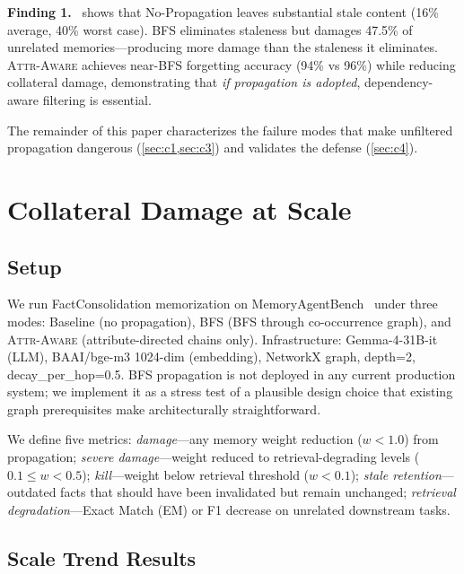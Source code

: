 \documentclass{article}
\newcommand{\attraware}{\textsc{Attr-Aware}}
\newcommand{\bfsprop}{\textsc{BFS}}
\newcommand{\finding}[1]{\vspace{2pt}\noindent\textbf{Finding #1.}~}
\begin{document}
\finding{1}
 shows that No-Propagation leaves substantial stale content (16\% average, 40\% worst case).
BFS eliminates staleness but damages 47.5\% of unrelated memories---producing more damage than the staleness it eliminates.
\attraware{} achieves near-BFS forgetting accuracy (94\% vs 96\%) while reducing collateral damage, demonstrating that \textit{if propagation is adopted}, dependency-aware filtering is essential.

The remainder of this paper characterizes the failure modes that make unfiltered propagation dangerous (\cref{sec:c1,sec:c3}) and validates the defense (\cref{sec:c4}).


\section{Collateral Damage at Scale}
\label{sec:c1}

\subsection{Setup}

We run FactConsolidation memorization on MemoryAgentBench~\citep{memoryagentbench_2026} under three modes: Baseline (no propagation), \bfsprop{} (BFS through co-occurrence graph), and \attraware{} (attribute-directed chains only).
Infrastructure: Gemma-4-31B-it (LLM), BAAI/bge-m3 1024-dim (embedding), NetworkX graph, depth=2, decay\_per\_hop=0.5.
BFS propagation is not deployed in any current production system; we implement it as a stress test of a plausible design choice that existing graph prerequisites make architecturally straightforward.

We define five metrics:
\textit{damage}---any memory weight reduction ($w < 1.0$) from propagation;
\textit{severe damage}---weight reduced to retrieval-degrading levels ($0.1 \leq w < 0.5$);
\textit{kill}---weight below retrieval threshold ($w < 0.1$);
\textit{stale retention}---outdated facts that should have been invalidated but remain unchanged;
\textit{retrieval degradation}---Exact Match (EM) or F1 decrease on unrelated downstream tasks.

\subsection{Scale Trend Results}
\end{document}
